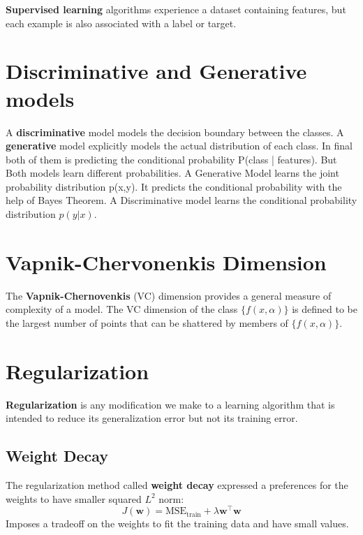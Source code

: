 \documentclass[12pt]{report}
\begin{document}
        \textbf{Supervised learning} algorithms experience a dataset containing features, but each example is also associated with a label or target.
        
    \section{Discriminative and Generative models}
        A \textbf{discriminative} model models the decision boundary between the classes. A \textbf{generative} model explicitly models the actual distribution of each class. In final both of them is predicting the conditional probability P(class | features). But Both models learn different probabilities.
        A Generative Model learns the joint probability distribution p(x,y). It predicts the conditional probability with the help of Bayes Theorem. A Discriminative model learns the conditional probability distribution $p(y|x)$.
    \section{Vapnik-Chervonenkis Dimension}
        The \textbf{Vapnik-Chernovenkis} (VC) dimension provides a general measure of complexity of a model. The VC dimension of the class $\{f(x, \alpha)\}$ is defined to be the largest number of points that can be shattered by members of $\{f(x, \alpha)\}$.
        
    \section{Regularization}
        \textbf{Regularization} is any modification we make to a learning algorithm that is intended to reduce its generalization error but not its training error.
        \subsection{Weight Decay}
            The regularization method called \textbf{weight decay} expressed a preferences for the weights to have smaller squared $L^2$ norm:
            \begin{equation}
                J(\boldsymbol{w}) = \text{MSE}_{\text{train}} + \lambda\boldsymbol{w}^\top\boldsymbol{w}
            \end{equation}
            Imposes a tradeoff on the weights to fit the training data and have small values.
        
\end{document}
